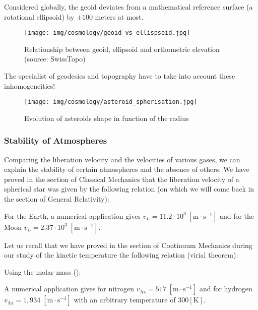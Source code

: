 	Considered globally, the geoid deviates from a mathematical reference surface (a rotational ellipsoid) by $\pm 100$ meters at most.
	\begin{figure}[H]
		\centering
		\texttt{[image: img/cosmology/geoid\_vs\_ellispsoid.jpg]}	
		\caption[]{Relationship between geoid, ellipsoid and orthometric elevation (source: SwissTopo)}
	\end{figure}
	The specialist of geodesics and topography have to take into account these inhomogeneities!
	\begin{figure}[H]
		\centering
		\texttt{[image: img/cosmology/asteroid\_spherisation.jpg]}	
		\caption{Evolution of asteroids shape in function of the radius}
	\end{figure}
	
	\subsubsection{Stability of Atmospheres}
	Comparing the liberation velocity and the velocities of various gases, we can explain the stability of certain atmospheres and the absence of others. We have proved in the section of Classical Mechanics that the liberation velocity of a spherical star was given by the following relation (on which we will come back in the section of General Relativity):
	
	For the Earth, a numerical application gives $v_L=11.2\cdot 10^3\;[\text{m}\cdot \text{s}^{-1}]$ and for the Moon $v_L=2.37\cdot 10^3\;[\text{m}\cdot \text{s}^{-1}]$.

	Let us recall that we have proved in the section of Continuum Mechanics during our study of the kinetic temperature the following relation (virial theorem):
	
	Using the molar mass ():
	
	A numerical application gives for nitrogen $v_\text{Az}=517\;[\text{m}\cdot \text{s}^{-1}]$ and for hydrogen $v_\text{Az}=1,934\;[\text{m}\cdot \text{s}^{-1}]$ with an arbitrary temperature of $300 [\text{K}]$.
	
